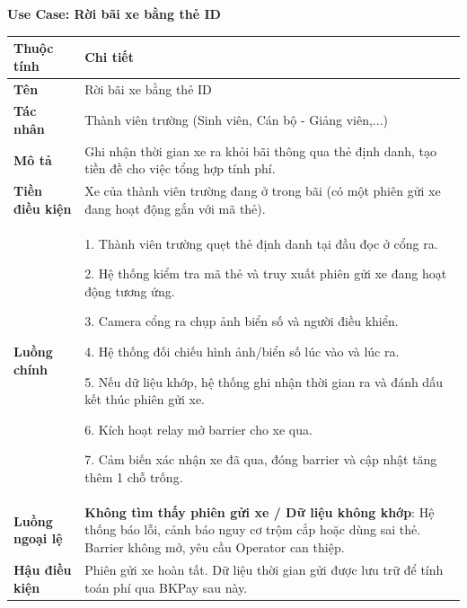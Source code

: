 \noindent \textbf{Use Case: Rời bãi xe bằng thẻ ID} \\
\renewcommand{\arraystretch}{1.6}
\begin{xltabular}{\textwidth}{|l|X|}
\hline
\textbf{Thuộc tính} & \textbf{Chi tiết} \\
\hline
\textbf{Tên} & Rời bãi xe bằng thẻ ID \\
\hline
\textbf{Tác nhân} & Thành viên trường (Sinh viên, Cán bộ - Giảng viên,...) \\
\hline
\textbf{Mô tả} & Ghi nhận thời gian xe ra khỏi bãi thông qua thẻ định danh, tạo tiền đề cho việc tổng hợp tính phí. \\
\hline
\textbf{Tiền điều kiện} & Xe của thành viên trường đang ở trong bãi (có một phiên gửi xe đang hoạt động gắn với mã thẻ). \\
\hline
\textbf{Luồng chính} & 
1. Thành viên trường quẹt thẻ định danh tại đầu đọc ở cổng ra.

2. Hệ thống kiểm tra mã thẻ và truy xuất phiên gửi xe đang hoạt động tương ứng.

3. Camera cổng ra chụp ảnh biển số và người điều khiển.

4. Hệ thống đối chiếu hình ảnh/biển số lúc vào và lúc ra.

5. Nếu dữ liệu khớp, hệ thống ghi nhận thời gian ra và đánh dấu kết thúc phiên gửi xe.

6. Kích hoạt relay mở barrier cho xe qua.

7. Cảm biến xác nhận xe đã qua, đóng barrier và cập nhật tăng thêm 1 chỗ trống.\\

\hline
\textbf{Luồng ngoại lệ} & 
\textbf{Không tìm thấy phiên gửi xe / Dữ liệu không khớp}: Hệ thống báo lỗi, cảnh báo nguy cơ trộm cắp hoặc dùng sai thẻ. Barrier không mở, yêu cầu Operator can thiệp.\\
\hline
\textbf{Hậu điều kiện} & Phiên gửi xe hoàn tất. Dữ liệu thời gian gửi được lưu trữ để tính toán phí qua BKPay sau này. \\
\hline
\end{xltabular}

